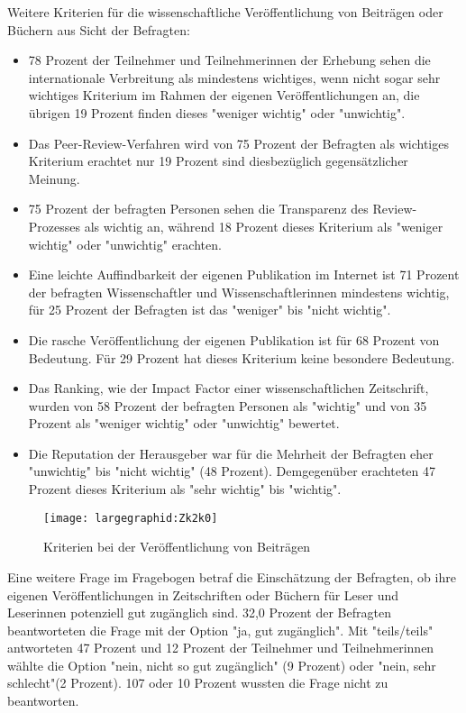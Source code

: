 Weitere Kriterien für die wissenschaftliche Veröffentlichung von Beiträgen oder Büchern aus Sicht der Befragten:
\begin{itemize}
\item 78 Prozent der Teilnehmer und Teilnehmerinnen der Erhebung sehen die internationale Verbreitung als mindestens wichtiges, wenn nicht sogar sehr wichtiges Kriterium im Rahmen der eigenen Veröffentlichungen an, die übrigen 19 Prozent finden dieses "weniger wichtig" oder "unwichtig".
\item Das Peer-Review-Verfahren wird von 75 Prozent der Befragten als wichtiges Kriterium erachtet nur 19 Prozent sind diesbezüglich gegensätzlicher Meinung.
\item 75 Prozent der befragten Personen sehen die Transparenz des Review-Prozesses als wichtig an, während 18 Prozent dieses Kriterium als "weniger wichtig" oder "unwichtig" erachten.
\item Eine leichte Auffindbarkeit der eigenen Publikation im Internet ist 71 Prozent der befragten Wissenschaftler und Wissenschaftlerinnen mindestens wichtig, für 25 Prozent der Befragten ist das "weniger" bis "nicht wichtig".
\item Die rasche Veröffentlichung der eigenen Publikation ist für 68 Prozent von Bedeutung. Für 29 Prozent hat dieses Kriterium keine besondere Bedeutung.
\item Das Ranking, wie der Impact Factor einer wissenschaftlichen Zeitschrift, wurden von 58 Prozent der befragten Personen als "wichtig" und von 35 Prozent als "weniger wichtig" oder "unwichtig" bewertet.
\item Die Reputation der Herausgeber war für die Mehrheit der Befragten eher "unwichtig" bis "nicht wichtig" (48 Prozent). Demgegenüber erachteten 47 Prozent dieses Kriterium als "sehr wichtig" bis "wichtig".
\end{itemize}

\begin{figure}[h!]
\texttt{[image: largegraphid:Zk2k0]}
\caption{Kriterien bei der Veröffentlichung von Beiträgen}
\end{figure}

Eine weitere Frage im Fragebogen betraf die Einschätzung der Befragten, ob ihre eigenen Veröffentlichungen in Zeitschriften oder Büchern für Leser und Leserinnen potenziell gut zugänglich sind. 32,0 Prozent der Befragten beantworteten die Frage mit der Option "ja, gut zugänglich". Mit "teils/teils" antworteten 47 Prozent und 12 Prozent der Teilnehmer und Teilnehmerinnen wählte die Option "nein, nicht so gut zugänglich" (9 Prozent) oder "nein, sehr schlecht"(2 Prozent). 107 oder 10 Prozent wussten die Frage nicht zu beantworten.

